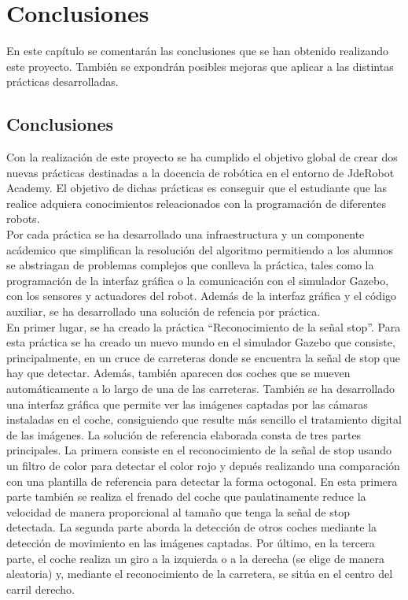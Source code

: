 \chapter{Conclusiones}\label{cap.conclusiones}
En este capítulo se comentarán las conclusiones que se han obtenido realizando este proyecto. También se expondrán posibles mejoras que aplicar a las distintas prácticas desarrolladas.

\section{Conclusiones}

Con la realización de este proyecto se ha cumplido el objetivo global de crear dos nuevas prácticas destinadas a la docencia de robótica en el entorno de JdeRobot Academy. El objetivo de dichas prácticas es conseguir que el estudiante que las realice adquiera conocimientos releacionados con la programación de diferentes robots.\\

Por cada práctica se ha desarrollado una infraestructura y un componente acádemico que simplifican la resolución del algoritmo permitiendo a los alumnos se abstriagan de problemas complejos que conlleva la práctica, tales como la programación de la interfaz gráfica o la comunicación con el simulador Gazebo, con los sensores y actuadores del robot. Además de la interfaz gráfica y el código auxiliar, se ha desarrollado una solución de refencia por práctica.\\

En primer lugar, se ha creado la práctica ``Reconocimiento de la señal stop''. Para esta práctica se ha creado un nuevo mundo en el simulador Gazebo que consiste, principalmente, en un cruce de carreteras donde se encuentra la señal de stop que hay que detectar. Además, también aparecen dos coches que se mueven automáticamente a lo largo de una de las carreteras. También se ha desarrollado una interfaz gráfica que permite ver las imágenes captadas por las cámaras instaladas en el coche, consiguiendo que resulte más sencillo el tratamiento digital de las imágenes. La solución de referencia elaborada consta de tres partes principales. La primera consiste en el reconocimiento de la señal de stop usando un filtro de color para detectar el color rojo y depués realizando una comparación con una plantilla de referencia para detectar la forma octogonal. En esta primera parte también se realiza el frenado del coche que  paulatinamente reduce la velocidad de manera proporcional al tamaño que tenga la señal de stop detectada. La segunda parte aborda la detección de otros coches mediante la detección de movimiento en las imágenes captadas. Por último, en la tercera parte, el coche realiza un giro a la izquierda o a la derecha (se elige de manera aleatoria) y, mediante el reconocimiento de la carretera, se sitúa en el centro del carril derecho.\\

